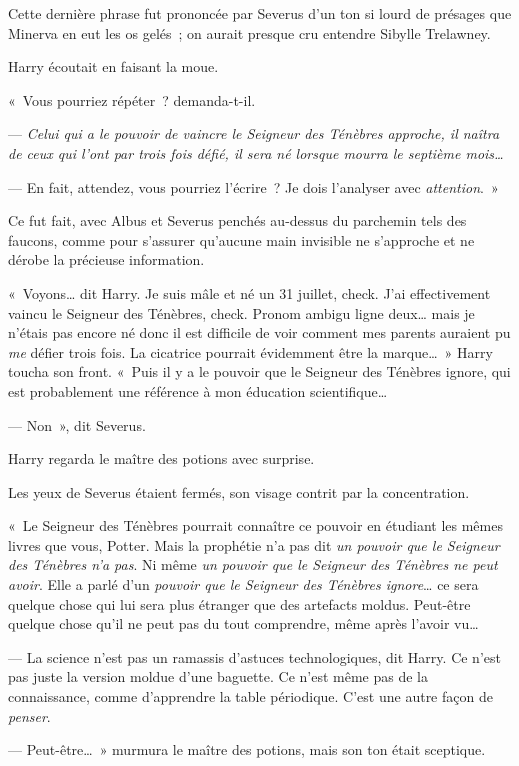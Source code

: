 Cette dernière phrase fut prononcée par Severus d'un ton si lourd de présages que Minerva en eut les os gelés~; on aurait presque cru entendre Sibylle Trelawney.

Harry écoutait en faisant la moue.

«~Vous pourriez répéter~? demanda-t-il.

--- \emph{Celui qui a le pouvoir de vaincre le Seigneur des Ténèbres approche, il naîtra de ceux qui l'ont par trois fois défié, il sera né lorsque mourra le septième mois…}

--- En fait, attendez, vous pourriez l'écrire~?
Je dois l'analyser avec \emph{attention}.~»

Ce fut fait, avec Albus et Severus penchés au-dessus du parchemin tels des faucons, comme pour s'assurer qu'aucune main invisible ne s'approche et ne dérobe la précieuse information.

«~Voyons… dit Harry.
Je suis mâle et né un 31 juillet, check.
J'ai effectivement vaincu le Seigneur des Ténèbres, check.
Pronom ambigu ligne deux… mais je n'étais pas encore né donc il est difficile de voir comment mes parents auraient pu \emph{me} défier trois fois.
La cicatrice pourrait évidemment être la marque…~»
Harry toucha son front.
«~Puis il y a le pouvoir que le Seigneur des Ténèbres ignore, qui est probablement une référence à mon éducation scientifique…

--- Non~», dit Severus.

Harry regarda le maître des potions avec surprise.

Les yeux de Severus étaient fermés, son visage contrit par la concentration.

«~Le Seigneur des Ténèbres pourrait connaître ce pouvoir en étudiant les mêmes livres que vous, Potter.
Mais la prophétie n'a pas dit \emph{un pouvoir que le Seigneur des Ténèbres n'a pas}.
Ni même \emph{un pouvoir que le Seigneur des Ténèbres ne peut avoir}.
Elle a parlé d'un \emph{pouvoir que le Seigneur des Ténèbres ignore}… ce sera quelque chose qui lui sera plus étranger que des artefacts moldus.
Peut-être quelque chose qu'il ne peut pas du tout comprendre, même après l'avoir vu…

--- La science n'est pas un ramassis d'astuces technologiques, dit Harry.
Ce n'est pas juste la version moldue d'une baguette.
Ce n'est même pas de la connaissance, comme d'apprendre la table périodique.
C'est une autre façon de \emph{penser}.

--- Peut-être…~»
murmura le maître des potions, mais son ton était sceptique.

